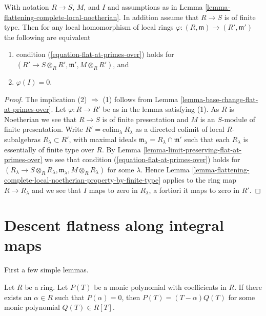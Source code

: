 \begin{lemma}
\label{lemma-flattening-complete-local-universal-property}
With notation $R \to S$, $M$, and $I$ and assumptions as in
Lemma \ref{lemma-flattening-complete-local-noetherian}.
In addition assume that $R \to S$ is of finite type.
Then for any local homomorphism of local rings
$\varphi : (R, \mathfrak m) \to (R', \mathfrak m')$
the following are equivalent
\begin{enumerate}
\item condition (\ref{equation-flat-at-primes-over}) holds
for $(R' \to S \otimes_R R', \mathfrak m', M \otimes_R R')$, and
\item $\varphi(I) = 0$.
\end{enumerate}
\end{lemma}

\begin{proof}
The implication (2) $\Rightarrow$ (1) follows from
Lemma \ref{lemma-base-change-flat-at-primes-over}.
Let $\varphi : R \to R'$ be as in the lemma satisfying (1).
As $R$ is Noetherian we see that $R \to S$ is of finite presentation
and $M$ is an $S$-module of finite presentation.
Write $R' = \text{colim}_\lambda\ R_\lambda$
as a directed colimit of local $R$-subalgebras $R_\lambda \subset R'$,
with maximal ideals $\mathfrak m_\lambda = R_\lambda \cap \mathfrak m'$
such that each $R_\lambda$ is essentially of finite type over $R$. By
Lemma \ref{lemma-limit-preserving-flat-at-primes-over}
we see that condition (\ref{equation-flat-at-primes-over}) holds for
$(R_\lambda \to S \otimes_R R_\lambda, \mathfrak m_\lambda,
M \otimes_R R_\lambda)$ for some $\lambda$. Hence
Lemma \ref{lemma-flattening-complete-local-noetherian-property-by-finite-type}
applies to the ring map $R \to R_\lambda$ and we see that
$I$ maps to zero in $R_\lambda$, a fortiori it maps to zero in $R'$.
\end{proof}




\section{Descent flatness along integral maps}
\label{section-descent-flatness-integral}

\noindent
First a few simple lemmas.

\begin{lemma}
\label{lemma-have-one-root}
Let $R$ be a ring. Let $P(T)$ be a monic polynomial with coefficients
in $R$. If there exists an $\alpha \in R$ such that $P(\alpha) = 0$, then
$P(T) = (T - \alpha)Q(T)$ for some monic polynomial $Q(T) \in R[T]$.
\end{lemma}

